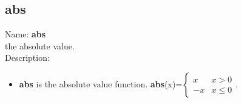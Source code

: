 \subsection{abs}
\label{lababs}
\noindent Name: \textbf{abs}\\
the absolute value.\\
\noindent Description: \begin{itemize}

\item \textbf{abs} is the absolute value function. \textbf{abs}(x)=$\left \lbrace \begin{array}{rl} x & x > 0 \\ -x & x \leq 0 \end{array}  \right.$.
\end{itemize}
